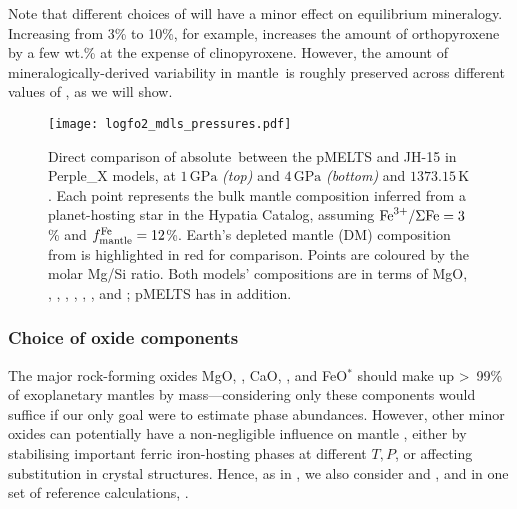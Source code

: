 Note that different choices of \xfer\;will have a minor effect on equilibrium mineralogy. Increasing \xfer\;from 3\% to 10\%, for example, increases the amount of orthopyroxene by a few wt.\% at the expense of clinopyroxene. %
However, the amount of mineralogically-derived variability in mantle \fo\,is roughly preserved across different values of \xfer, as we will show.


\begin{figure}
\centering
  \texttt{[image: logfo2\_mdls\_pressures.pdf]}
\caption[Direct comparison of absolute \fo\,between the pMELTS and Perple\_X models.]{\label{fig:model_comp}Direct comparison of absolute \fo\,between the pMELTS and JH-15 in Perple\_X models, at $1\,\text{GPa}$ \textit{(top)} and $4\,\text{GPa}$ \textit{(bottom)} and $1373.15\,\text{K}$. Each point represents the bulk mantle composition inferred from a planet-hosting star in the Hypatia Catalog, assuming ${\rm Fe}^{3+}/\Sigma{\rm Fe} = 3$\% and $f^{\rm Fe}_{\rm mantle} = 12$\%. Earth's depleted mantle (DM) composition from \citet{workman_major_2005} is highlighted in red for comparison. Points are coloured by the molar Mg/Si ratio. Both models' compositions are in terms of MgO, , , , , , , and ; pMELTS has  in addition.}
\end{figure}


\subsubsection{Choice of oxide components}\label{sec:methods-components}

The major rock-forming oxides MgO, , CaO, , and FeO$^*$ should make up \textgreater~99\% of exoplanetary mantles by mass---considering only these components would suffice if our only goal were to estimate phase abundances. However, other minor oxides can potentially have a non-negligible influence on mantle \fo, either by stabilising important ferric iron-hosting phases at different $T,P$, or affecting \ferric\,substitution in crystal structures. Hence, as in \citet{stolper_effects_2020}, we also consider  and , and in one set of reference calculations, . 


